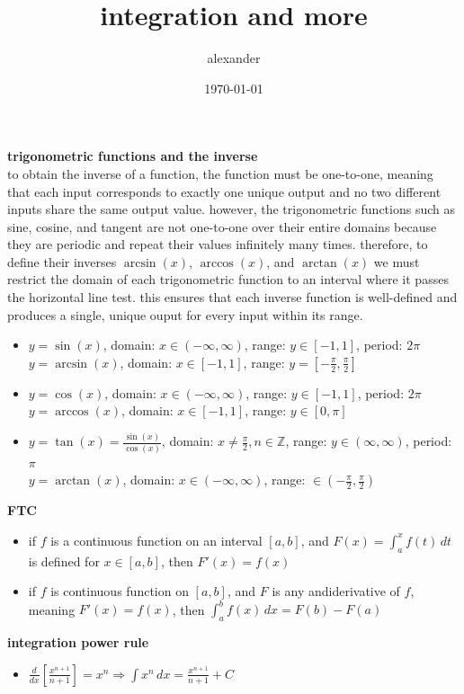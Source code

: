 \documentclass{article}
\title{integration and more}
\author{alexander}
\date{\today}
\begin{document}
\maketitle

\textbf{trigonometric functions and the inverse}\\
to obtain the inverse of a function, the function must be one-to-one, meaning that each input corresponds to exactly one unique output and no two different inputs share the same output value. however, the trigonometric functions such as sine, cosine, and tangent are not one-to-one over their entire domains because they are periodic and repeat their values infinitely many times. therefore, to define their inverses $\arcsin(x)$, $\arccos(x)$, and $\arctan(x)$ we must restrict the domain of each trigonometric function to an interval where it passes the horizontal line test. this ensures that each inverse function is well-defined and produces a single, unique ouput for every input within its range.	
	\begin{itemize}
		\item $y = \sin(x)$, domain: $x \in (-\infty, \infty)$, range: $y \in [-1, 1]$, period: $2\pi$\\
			$y = \arcsin(x)$, domain: $x \in [-1, 1]$, range: $y = [-\frac{\pi}{2}, \frac{\pi}{2}]$
		\item $y = \cos(x)$, domain: $x \in (-\infty, \infty)$, range: $y \in [-1, 1]$, period: $2\pi$\\
			$y = \arccos(x)$, domain: $x \in [-1, 1]$, range: $y \in [0, \pi]$
		\item $y = \tan(x) = \frac{\sin(x)}{\cos(x)}$, domain: $x \neq \frac{\pi}{2}, n \in \mathbb{Z}$, range: $y \in (\infty, \infty)$, period: $\pi$\\
			$y = \arctan(x)$, domain: $x \in (-\infty, \infty)$, range: $\in (-\frac{\pi}{2}, \frac{\pi}{2})$
	\end{itemize}	

\textbf{FTC}
	\begin{itemize}
		\item if $f$ is a continuous function on an interval $[a, b]$, and $F(x) = \int_{a}^{x}f(t)\,dt$ is defined for $x \in [a, b]$, then $F'(x) = f(x)$
		\item if $f$ is continuous function on $[a, b]$, and $F$ is any andiderivative of $f$, meaning $F'(x) = f(x)$, then $\int_{a}^{b}f(x)\,dx = F(b) - F(a)$
	\end{itemize}

\textbf{integration power rule}
        \begin{itemize}
                \item $\frac{d}{dx}[\frac{x^{n+1}}{n+1}] = x^n \Rightarrow \int x^n\,dx = \frac{x^{n+1}}{n+1} + C$
        \end{itemize}
                
\end{document}
